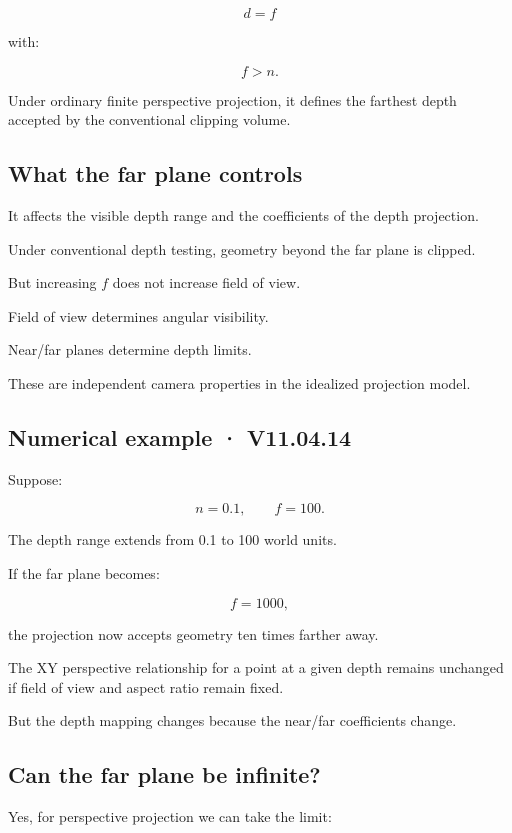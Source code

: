 \[
 \boxed{d=f}
\]

with:

\[
 f>n.
\]

Under ordinary finite perspective projection, it defines the farthest depth accepted by the conventional clipping volume.

\subsection{What the far plane controls}\label{02-foundations-ii-ch033-what-the-far-plane-controls}

It affects the visible depth range and the coefficients of the depth projection.

Under conventional depth testing, geometry beyond the far plane is clipped.

But increasing \(f\) does not increase field of view.

Field of view determines angular visibility.

Near/far planes determine depth limits.

These are independent camera properties in the idealized projection model.

\subsection{Numerical example · V11.04.14}\label{02-foundations-ii-ch033-numerical-example-v11.04.14}

Suppose:

\[
 n=0.1,\qquad f=100.
\]

The depth range extends from 0.1 to 100 world units.

If the far plane becomes:

\[
 f=1000,
\]

the projection now accepts geometry ten times farther away.

The XY perspective relationship for a point at a given depth remains unchanged if field of view and aspect ratio remain fixed.

But the depth mapping changes because the near/far coefficients change.

\subsection{Can the far plane be infinite?}\label{02-foundations-ii-ch033-can-the-far-plane-be-infinite}

Yes, for perspective projection we can take the limit:


